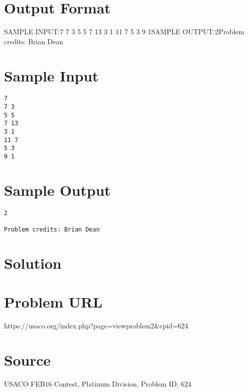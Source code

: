 \documentclass[12pt]{article}
\begin{document}
\section*{Output Format}
SAMPLE INPUT:7
7 3
5 5
7 13
3 1
11 7
5 3
9 1SAMPLE OUTPUT:2Problem credits: Brian Dean

\section*{Sample Input}
\begin{verbatim}
7
7 3
5 5
7 13
3 1
11 7
5 3
9 1
\end{verbatim}

\section*{Sample Output}
\begin{verbatim}
2

Problem credits: Brian Dean
\end{verbatim}

\section*{Solution}


\section*{Problem URL}
https://usaco.org/index.php?page=viewproblem2&cpid=624

\section*{Source}
USACO FEB16 Contest, Platinum Division, Problem ID: 624
\end{document}
